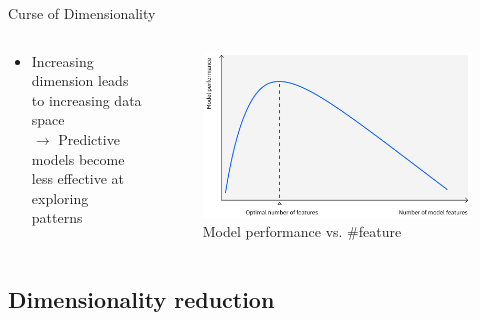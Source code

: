 \begin{frame}{Curse of Dimensionality}
    \begin{columns}
        \begin{column}{0.6\textwidth}
            \begin{itemize}
                \item Increasing dimension leads to increasing data space\\$\rightarrow$ Predictive models become less effective at exploring patterns
            \end{itemize}
        \end{column}

        \begin{column}{0.5\textwidth}
            \begin{figure}
                \centering
                \includegraphics[width=\linewidth]{img/model_performance.png}
                \caption{Model performance vs. \#feature}
                \label{fig:enter-label}
            \end{figure}
        \end{column}
    \end{columns}
\end{frame}

\subsection{Dimensionality reduction}

